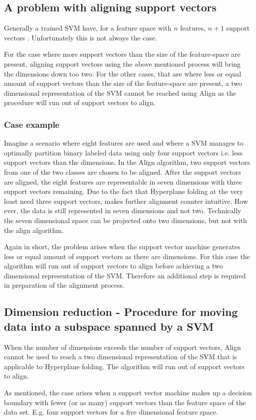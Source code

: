 \documentclass[a4paper,twoside]{bth}
\begin{document}
\subsection{A problem with aligning support vectors} 
Generally a trained SVM have, for a feature space with $n$ features, $n + 1$ support vectors \cite{unpublished}. Unfortunately this is not always the case. 
\par For the case where more support vectors than the size of the feature-space are present, aligning support vectors using the above mentioned process will bring the dimensions down too two. For the other cases, that are where less or equal amount of support vectors than the size of the feature-space are present, a two dimensional representation of the SVM cannot be reached using Align as the procedure will run out of support vectors to align.

\subsubsection{Case example} Imagine a scenario where eight features are used and where a SVM manages to optimally partition binary labeled data using only four support vectors i.e. less support vectors than the dimensions. In the Align algorithm, two support vectors from one of the two classes are chosen to be aligned. After the support vectors are aligned, the eight features are representable in seven dimensions with three support vectors remaining. Due to the fact that Hyperplane folding at the very least need three support vectors, makes further alignment counter intuitive. How ever, the data is still represented in seven dimensions and not two. Technically the seven dimensional space can be projected onto two dimensions, but not with the align algorithm.\\

\par Again in short, the problem arises when the support vector machine generates less or equal amount of support vectors as there are dimensions. For this case the algorithm will run out of support vectors to align before achieving a two dimensional representation of the SVM. Therefore an additional step is required in preparation of the alignment process.

\subsection{Dimension reduction - Procedure for moving data into a subspace spanned by a SVM}
When the number of dimensions exceeds the number of support vectors, Align cannot be used to reach a two dimensional representation of the SVM that is applicable to Hyperplane folding. The algorithm will run out of support vectors to align. 
\par As mentioned, the case arises when a support vector machine makes up a decision boundary with fewer (or as many) support vectors than the feature space of the data set. E.g. four support vectors for a five dimensional feature space.
\end{document}
